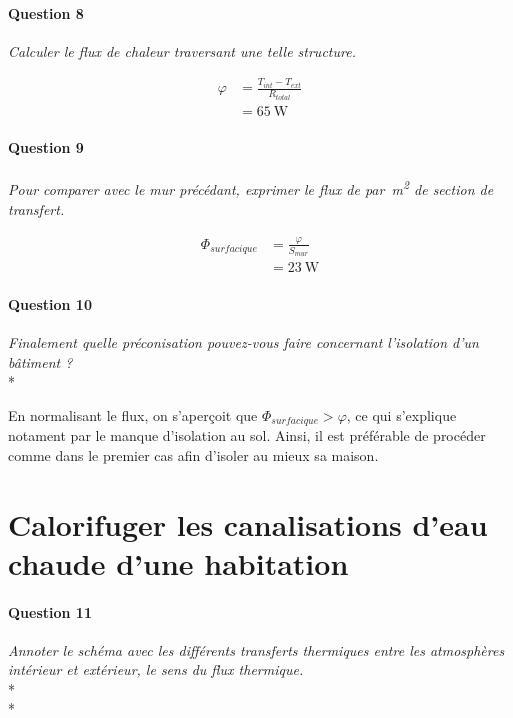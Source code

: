 \documentclass[oneside,a4paper,13pt]{book}
\begin{document}
\paragraph{Question 8} 
\textit{Calculer le flux de chaleur traversant une telle structure.} 

\begin{equation} \label{eq9}
\begin{split}
	\varphi & = \frac{T_{int} - T_{ext}}{R_{total}} \\
	& = \SI{65}{\watt}
\end{split}
\end{equation}

\paragraph{Question 9} 
\textit{Pour comparer avec le mur précédant, exprimer le flux de par\SI{}{ \meter\squared} de section de transfert.} 

\begin{equation} \label{eq10}
\begin{split}
	\Phi_{surfacique} & = \frac{\varphi}{S_{mur}} \\
	& = \SI{23}{\watt}
\end{split}
\end{equation}


\paragraph{Question 10} 
\textit{Finalement quelle préconisation pouvez-vous faire concernant l’isolation d’un bâtiment ?} \\* 

En normalisant le flux, on s'aperçoit que $\Phi_{surfacique} > \varphi$, ce qui s'explique notament par le manque d'isolation au sol. Ainsi, il est préférable de procéder comme dans le premier cas afin d'isoler au mieux sa maison.

\newpage
\section{Calorifuger les canalisations d'eau chaude d'une habitation}

\paragraph{Question 11} 
\textit{Annoter le schéma avec les différents transferts thermiques entre les atmosphères intérieur et extérieur, le sens du flux thermique.} \\* \\*
\end{document}
